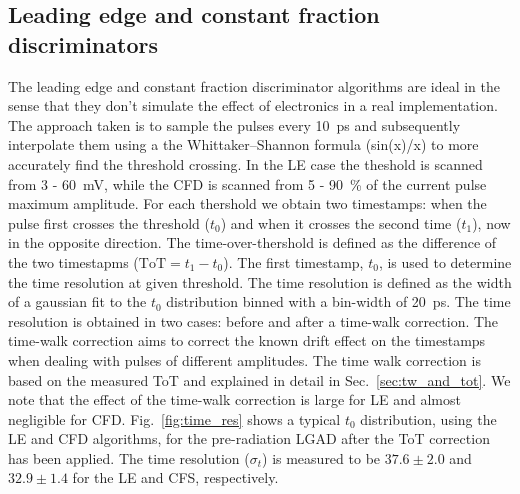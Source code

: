 \documentclass[preprint,1p]{elsarticle}
\begin{document}
\subsection{Leading edge and constant fraction discriminators}\label{sec:le_and_cfd}
The leading edge and constant fraction discriminator algorithms are ideal in the sense that they don't simulate the effect of
electronics in a real implementation. The approach taken is to sample the pulses every 10~\si{ps} and subsequently interpolate them
 using a the Whittaker–Shannon formula (sin(x)/x) to more accurately find the threshold crossing. In the LE case the theshold is scanned
 from 3 - 60~\si{mV}, while the CFD is scanned from 5 - 90~\% of the current pulse maximum amplitude. For each thershold we obtain two
 timestamps: when the pulse first crosses the threshold ($t_{0}$) and when it crosses the second time ($t_{1}$), now in the opposite
 direction. The time-over-thershold is defined as the difference of the two timestapms ($\mathrm{ToT} = t_{1} - t_{0}$). The first
 timestamp, $t_{0}$, is used to determine the time resolution at given threshold. The time resolution is defined as the width of
 a gaussian fit to the $t_{0}$ distribution binned with a bin-width of 20~\si{ps}. The time resolution is obtained in two cases:
 before and after a time-walk correction. The time-walk correction aims to correct the known drift effect on the timestamps when
 dealing with pulses of different amplitudes. The time walk correction is based on the measured ToT and explained in detail
 in Sec.~\ref{sec:tw_and_tot}. We note that the effect of the time-walk correction is large for LE and almost negligible for CFD.
 Fig.~\ref{fig:time_res} shows a typical $t_{0}$ distribution, using the LE and CFD algorithms, for the pre-radiation
  LGAD after the ToT correction has been applied. The time resolution ($\sigma_{t}$) is measured to be $37.6 \pm 2.0 $
  and $32.9 \pm 1.4$ for the LE and CFS, respectively.
\end{document}
